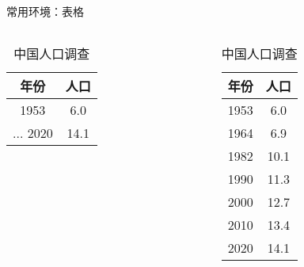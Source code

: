 \begin{frame}[fragile]{常用环境：表格}
\begin{columns}
\begin{column}{0.62\textwidth}
  \begin{texcode}[gobble=4, moretexcs={\toprule,\midrule,\bottomrule},
      emph={[1]table,tabular}, emph={[2]booktabs}]
    \usepackage{booktabs} %
    \begin{table}
      \caption{中国人口调查}
      \label{tab:china-population}
      \begin{tabular}{cc}
        \toprule
          年份 & 人口 \\
        \midrule
          1953 &  6.0 \\
          ...
          2020 & 14.1 \\
        \bottomrule
      \end{tabular}
    \end{table}
  \end{texcode}
\end{column}
\pause
\begin{column}{0.3\textwidth}
  \begin{table}
    \caption{中国人口调查}
    \label{tab:china-population_}
    \footnotesize
    \begin{tabular}{cc}
      \toprule
        年份 & 人口 \\
      \midrule
        1953 &  6.0 \\
        1964 &  6.9 \\
        1982 & 10.1 \\
        1990 & 11.3 \\
        2000 & 12.7 \\
        2010 & 13.4 \\
        2020 & 14.1 \\
      \bottomrule
    \end{tabular}
  \end{table}
\end{column}
\end{columns}
\end{frame}

